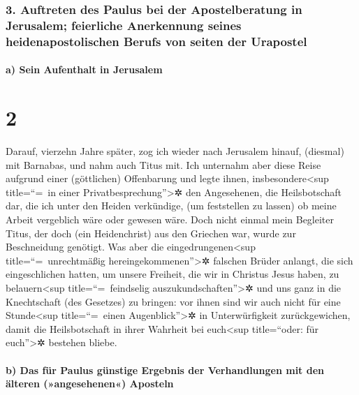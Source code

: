 \hypertarget{auftreten-des-paulus-bei-der-apostelberatung-in-jerusalem-feierliche-anerkennung-seines-heidenapostolischen-berufs-von-seiten-der-urapostel}{%
\subsubsection{3. Auftreten des Paulus bei der Apostelberatung in
Jerusalem; feierliche Anerkennung seines heidenapostolischen Berufs von
seiten der
Urapostel}\label{auftreten-des-paulus-bei-der-apostelberatung-in-jerusalem-feierliche-anerkennung-seines-heidenapostolischen-berufs-von-seiten-der-urapostel}}

\hypertarget{a-sein-aufenthalt-in-jerusalem}{%
\paragraph{a) Sein Aufenthalt in
Jerusalem}\label{a-sein-aufenthalt-in-jerusalem}}

\hypertarget{section-1}{%
\section{2}\label{section-1}}

 Darauf, vierzehn Jahre später, zog ich wieder nach
Jerusalem hinauf, (diesmal) mit Barnabas, und nahm auch Titus mit.
 Ich unternahm aber diese Reise aufgrund einer
(göttlichen) Offenbarung und legte ihnen, insbesondere\textless sup
title=``=~in einer Privatbesprechung''\textgreater✲ den Angesehenen, die
Heilsbotschaft dar, die ich unter den Heiden verkündige, (um feststellen
zu lassen) ob meine Arbeit vergeblich wäre oder gewesen wäre.
 Doch nicht einmal mein Begleiter Titus, der doch (ein
Heidenchrist) aus den Griechen war, wurde zur Beschneidung genötigt.
 Was aber die eingedrungenen\textless sup
title=``=~unrechtmäßig hereingekommenen''\textgreater✲ falschen Brüder
anlangt, die sich eingeschlichen hatten, um unsere Freiheit, die wir in
Christus Jesus haben, zu belauern\textless sup title=``=~feindselig
auszukundschaften''\textgreater✲ und uns ganz in die Knechtschaft (des
Gesetzes) zu bringen:  vor ihnen sind wir auch nicht für
eine Stunde\textless sup title=``=~einen Augenblick''\textgreater✲ in
Unterwürfigkeit zurückgewichen, damit die Heilsbotschaft in ihrer
Wahrheit bei euch\textless sup title=``oder: für euch''\textgreater✲
bestehen bliebe.

\hypertarget{b-das-fuxfcr-paulus-guxfcnstige-ergebnis-der-verhandlungen-mit-den-uxe4lteren-angesehenen-aposteln}{%
\paragraph{b) Das für Paulus günstige Ergebnis der Verhandlungen mit den
älteren (»angesehenen«)
Aposteln}\label{b-das-fuxfcr-paulus-guxfcnstige-ergebnis-der-verhandlungen-mit-den-uxe4lteren-angesehenen-aposteln}}

